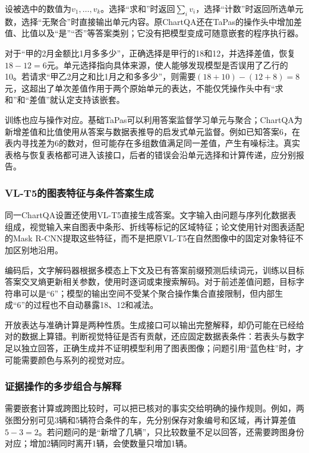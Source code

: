 设被选中的数值为$v_1,\ldots,v_k$。选择“求和”时返回$\sum_i v_i$，选择“计数”时返回所选单元数，选择“无聚合”时直接输出单元内容。原ChartQA还在TaPas的操作头中增加差值、比值以及“是”“否”等答案类别；它没有把模型变成可随意嵌套的程序执行器。

对于“甲的2月金额比1月多多少”，正确选择是甲行的18和12，并选择差值，恢复$18-12=6$元。单元选择指向具体来源，使人能够发现模型是否误用了乙行的10。若请求“甲乙2月之和比1月之和多多少”，则需要$(18+10)-(12+8)=8$元，这超出了单次差值作用于两个原始单元的表达，不能仅凭操作头中有“求和”和“差值”就认定支持该嵌套。

训练也应与操作对应。基础TaPas可以利用答案监督学习单元与聚合；ChartQA为新增差值和比值使用从答案与数据表推导的启发式单元监督。例如已知答案6，在表内寻找差为6的数对，但可能存在多组数值满足同一差值，产生有噪标注。真实表格与恢复表格都可进入该接口，后者的错误会沿单元选择和计算传递，应分别报告。

\subsubsection{VL-T5的图表特征与条件答案生成}
\label{sec:vision-understanding-vlt5}

同一ChartQA设置还使用VL-T5直接生成答案。文字输入由问题与序列化数据表组成，视觉输入来自图表中条形、折线等标记的区域特征；论文使用针对图表适配的Mask R-CNN提取这些特征，而不是把原VL-T5在自然图像中的固定对象特征不加区别地沿用。

编码后，文字解码器根据多模态上下文及已有答案前缀预测后续词元，训练以目标答案交叉熵更新相关参数，使用时逐词或束搜索解码。对于前述差值问题，目标字符串可以是“6”；模型的输出空间不受某个聚合操作集合直接限制，但内部生成“6”的过程也不自动暴露18、12和减法。

开放表达与准确计算是两种性质。生成接口可以输出完整解释，却仍可能在已经给对的数据上算错。判断视觉特征是否有贡献，还应固定数据表条件：若表头与数字足以独立回答，正确生成并不证明模型利用了图表图像；问题引用“蓝色柱”时，才可能需要颜色与系列的视觉对应。

\subsubsection{证据操作的多步组合与解释}
\label{sec:vision-understanding-evidence-operations}

需要嵌套计算或跨图比较时，可以把已核对的事实交给明确的操作规则。例如，两张图分别可见3辆和5辆符合条件的车，先分别保存对象编号和区域，再计算差值$5-3=2$。若问题问的是“新增了几辆”，只比较数量不足以回答，还需要跨图身份对应；增加2辆同时离开1辆，会使数量只增加1辆。

